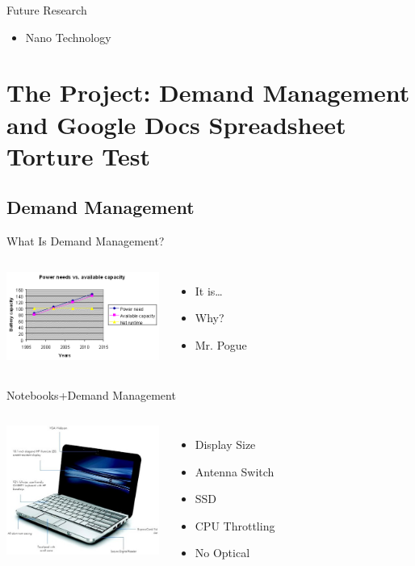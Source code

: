 \documentclass{beamer}
\begin{document}
\begin{frame}{Future Research}
  \begin{itemize}
  \item Nano Technology
  \end{itemize}
\end{frame}

\section[Research Project]{The Project: Demand Management and Google Docs Spreadsheet Torture Test}

\subsection{Demand Management}

\begin{frame}{What Is Demand Management? }
  \begin{columns}
    \column{5cm}
      \includegraphics[width=5cm]{demandGraph.png}
    \column{5cm}
    \begin{itemize}
    \item It is\dots
    \item Why?
    \item Mr. Pogue
    \end{itemize}
  \end{columns}
\end{frame}

\begin{frame}{Notebooks+Demand Management}
  \begin{columns}
    \column{5cm}
      \includegraphics[width=5cm]{netbookDiagram.jpg}
    \column{5cm}
    \begin{itemize}
    \item Display Size
    \item Antenna Switch
    \item SSD
    \item CPU Throttling
    \item No Optical
    \end{itemize}
  \end{columns}
\end{frame}
\end{document}
